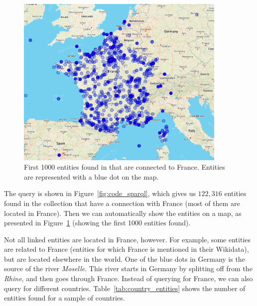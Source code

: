 \begin{figure}[!t]
	\centering
	\includegraphics[width=0.9\textwidth]{imgs/france.png}
	\caption{First 1000 entities found in that are connected to France. Entities are represented with a blue dot on the map.}
	\label{fig:france}
\end{figure}

The query is shown in Figure~\ref{fig:code_sparql}, which gives us $122,316$ entities found in the collection that have a connection with France (most of them are located in France). Then we can automatically show the entities on a map, as presented in Figure~\ref{fig:france} (showing the first 1000 entities found). 

Not all linked entities are located in France, however. For example, some entities are related to France (entities for which France is mentioned in their Wikidata), but are located elsewhere in the world. One of the blue dots in Germany is the source of the river \emph{Moselle}. This river starts in Germany by splitting off from the \emph{Rhine}, and then goes through France. 
Instead of querying for France, we can also query for different countries. Table~\ref{tab:country_entities} shows the number of entities found for a sample of countries.

